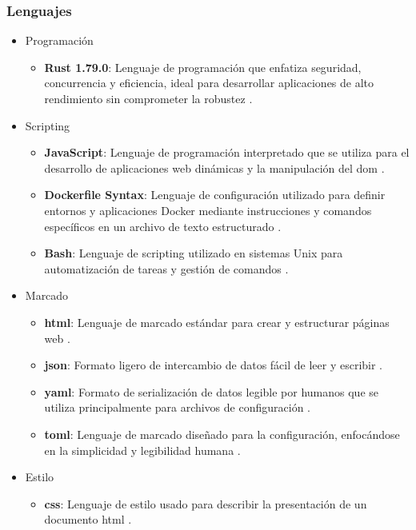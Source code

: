 \subsubsection*{Lenguajes}
\begin{itemize}
\item Programación
    \begin{itemize}
    \item \textbf{Rust 1.79.0}: Lenguaje de programación que enfatiza seguridad, concurrencia y eficiencia, ideal para desarrollar aplicaciones de alto rendimiento sin comprometer la robustez \cite{rust_release_notes_1_79}.
    \end{itemize}
\item Scripting
    \begin{itemize}
    \item \textbf{JavaScript}: Lenguaje de programación interpretado que se utiliza para el desarrollo de aplicaciones web dinámicas y la manipulación del \ac{dom} \cite{mozilla_js}.
    \item \textbf{Dockerfile Syntax}: Lenguaje de configuración utilizado para definir entornos y aplicaciones Docker mediante instrucciones y comandos específicos en un archivo de texto estructurado \cite{dockerfile}.
    \item \textbf{Bash}: Lenguaje de scripting utilizado en sistemas Unix para automatización de tareas y gestión de comandos \cite{bash}.
    \end{itemize}
\item Marcado
    \begin{itemize}
    \item \textbf{\ac{html}}: Lenguaje de marcado  estándar para crear y estructurar páginas web \cite{html}.
    \item \textbf{\ac{json}}: Formato ligero de intercambio de datos fácil de leer y escribir \cite{json}.
    \item \textbf{\ac{yaml}}: Formato de serialización de datos legible por humanos que se utiliza principalmente para archivos de configuración \cite{yaml}.
    \item \textbf{\ac{toml}}: Lenguaje de marcado diseñado para la configuración, enfocándose en la simplicidad y legibilidad humana \cite{toml}.
    \end{itemize}
\item Estilo
    \begin{itemize}
    \item \textbf{\ac{css}}: Lenguaje de estilo usado para describir la presentación de un documento \ac{html} \cite{rust_release_notes_1_79}.
    \end{itemize}
\end{itemize}
